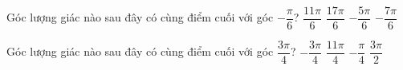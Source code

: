 \begin{ex}%
	Góc lượng giác nào sau đây có cùng điểm cuối với góc $-\dfrac{\pi}{6}$?
	\choice
	{\True $\dfrac{11\pi}{6}$}
	{$\dfrac{17\pi}{6}$}
	{$-\dfrac{5\pi}{6}$}
	{$-\dfrac{7\pi}{6}$}
\end{ex}
\begin{ex}%
	Góc lượng giác nào sau đây có cùng điểm cuối với góc $\dfrac{3\pi}{4}$?
	\choice
	{$-\dfrac{3\pi}{4}$}
	{\True $\dfrac{11\pi}{4}$}
	{$-\dfrac{\pi}{4}$}
	{$\dfrac{3\pi}{2}$}
\end{ex}
